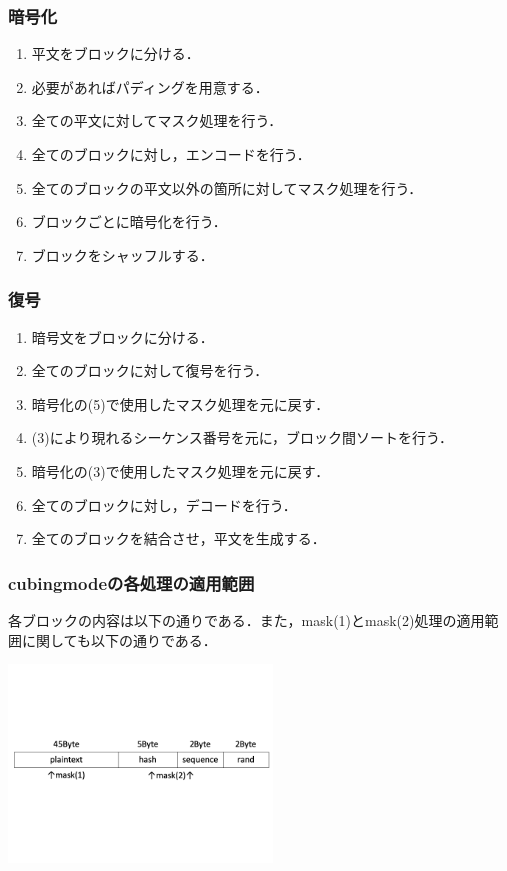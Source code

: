 \documentclass[a4p]{jarticle}
\begin{document}
\subsubsection{暗号化}
\begin{enumerate}
\item 平文をブロックに分ける．
\item 必要があればパディングを用意する．
\item 全ての平文に対してマスク処理を行う．
\item 全てのブロックに対し，エンコードを行う．
\item 全てのブロックの平文以外の箇所に対してマスク処理を行う．
\item ブロックごとに暗号化を行う．
\item ブロックをシャッフルする．
\end{enumerate}

\subsubsection{復号}
\begin{enumerate}
\item 暗号文をブロックに分ける．
\item 全てのブロックに対して復号を行う．
\item 暗号化の(5)で使用したマスク処理を元に戻す．
\item (3)により現れるシーケンス番号を元に，ブロック間ソートを行う．
\item 暗号化の(3)で使用したマスク処理を元に戻す．
\item 全てのブロックに対し，デコードを行う．
\item 全てのブロックを結合させ，平文を生成する．
\end{enumerate}

\subsubsection{cubingmodeの各処理の適用範囲}
各ブロックの内容は以下の通りである．また，mask(1)とmask(2)処理の適用範囲に関しても以下の通りである．
\begin{center}
  \includegraphics[width=7cm]{./tex_pic/block.png}\\
\end{center}
\end{document}
